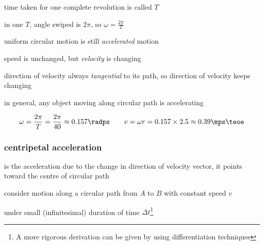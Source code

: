 \cmt time taken for one complete revolution is called  $T$

in one $T$, angle swiped is $2\pi$, so $\boxed{\omega=\frac{2\pi}{T}}$

\cmt uniform circular motion is still \emph{accelerated} motion

speed is unchanged, but \emph{velocity} is changing

direction of velocity always \emph{tangential} to its path, so direction of velocity keeps changing

in general, any object moving along circular path is accelerating


\solc
\begin{equation*}
	\omega = \frac{2\pi}{T} = \frac{2\pi}{40} \approx 0.157 \radps \qquad v = \omega r = 0.157 \times 2.5 \approx 0.39 \mps \teoe
\end{equation*}




\subsubsection{centripetal acceleration}

\rcyskip

\begin{ilight}
	 is the acceleration due to the change in direction of velocity vector, it points toward the centre of circular path
\end{ilight}

consider motion along a circular path from $A$ to $B$ with constant speed $v$

under small (infinitesimal) duration of time $\Delta t$\footnote{A more rigorous derivation can be given by using differentiation techniques}

